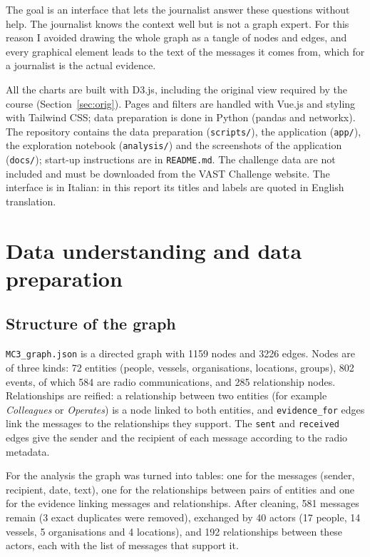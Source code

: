 \documentclass[11pt,a4paper]{article}
\begin{document}
The goal is an interface that lets the journalist answer these questions without help. The journalist knows the
context well but is not a graph expert. For this reason I avoided drawing the whole graph as a tangle of nodes and
edges, and every graphical element leads to the text of the messages it comes from, which for a journalist is the
actual evidence.

All the charts are built with D3.js, including the original view required by the course (Section~\ref{sec:orig}).
Pages and filters are handled with Vue.js and styling with Tailwind CSS; data preparation is done in Python (pandas and
networkx). The repository contains the data preparation (\texttt{scripts/}), the application (\texttt{app/}), the
exploration notebook (\texttt{analysis/}) and the screenshots of the application (\texttt{docs/}); start-up instructions are in
\texttt{README.md}. The
challenge data are not included and must be downloaded from the VAST Challenge website. The interface is in
Italian: in this report its titles and labels are quoted in English translation.

\section{Data understanding and data preparation}
\subsection{Structure of the graph}
\texttt{MC3\_graph.json} is a directed graph with 1159 nodes and 3226 edges. Nodes are of three kinds: 72 entities
(people, vessels, organisations, locations, groups), 802 events, of which 584 are radio communications, and 285
relationship nodes. Relationships are reified: a relationship between two entities (for example \emph{Colleagues}
or \emph{Operates}) is a node linked to both entities, and \texttt{evidence\_for} edges link the messages to the
relationships they support. The \texttt{sent} and \texttt{received} edges give the sender and the recipient of each
message according to the radio metadata.

For the analysis the graph was turned into tables: one for the messages (sender, recipient, date, text), one for the
relationships between pairs of entities and one for the evidence linking messages and relationships. After cleaning,
581 messages remain (3 exact duplicates were removed), exchanged by 40 actors (17 people, 14 vessels,
5 organisations and 4 locations), and 192 relationships between these actors, each with the list of messages that
support it.
\end{document}
